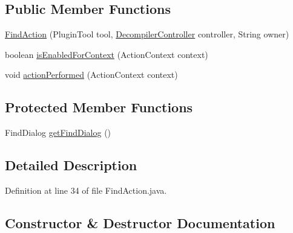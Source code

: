 \subsection*{Public Member Functions}
\begin{DoxyCompactItemize}
\item 
\mbox{\hyperlink{classghidra_1_1app_1_1plugin_1_1core_1_1decompile_1_1actions_1_1_find_action_a0d7e610b21288850e97a9c0a1f3eb6d1}{Find\+Action}} (Plugin\+Tool tool, \mbox{\hyperlink{classghidra_1_1app_1_1decompiler_1_1component_1_1_decompiler_controller}{Decompiler\+Controller}} controller, String owner)
\item 
boolean \mbox{\hyperlink{classghidra_1_1app_1_1plugin_1_1core_1_1decompile_1_1actions_1_1_find_action_ab8667102b1d2308c7a4de72d62223da2}{is\+Enabled\+For\+Context}} (Action\+Context context)
\item 
void \mbox{\hyperlink{classghidra_1_1app_1_1plugin_1_1core_1_1decompile_1_1actions_1_1_find_action_a047e89d039f5e9c44916d7d309cb9fea}{action\+Performed}} (Action\+Context context)
\end{DoxyCompactItemize}
\subsection*{Protected Member Functions}
\begin{DoxyCompactItemize}
\item 
Find\+Dialog \mbox{\hyperlink{classghidra_1_1app_1_1plugin_1_1core_1_1decompile_1_1actions_1_1_find_action_a56f348b40820d2f851835e40637cef93}{get\+Find\+Dialog}} ()
\end{DoxyCompactItemize}


\subsection{Detailed Description}


Definition at line 34 of file Find\+Action.\+java.



\subsection{Constructor \& Destructor Documentation}
\mbox{\label{classghidra_1_1app_1_1plugin_1_1core_1_1decompile_1_1actions_1_1_find_action_a0d7e610b21288850e97a9c0a1f3eb6d1}} 
